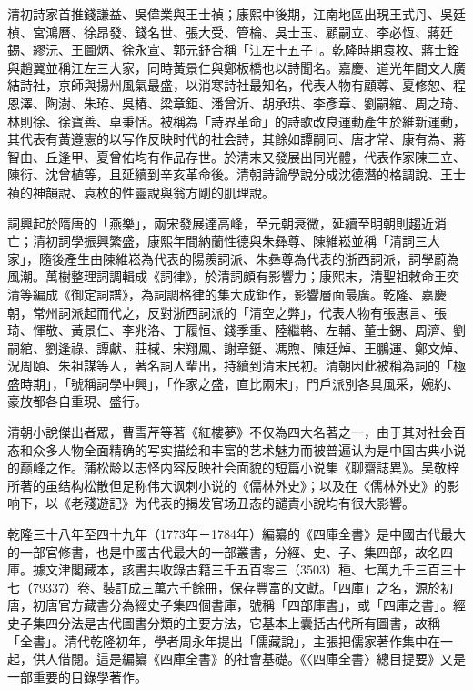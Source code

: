 清初詩家首推錢謙益、吳偉業與王士禎；康熙中後期，江南地區出現王式丹、吳廷楨、宮鴻曆、徐昂發、錢名世、張大受、管棆、吳士玉、顧嗣立、李必恆、蔣廷錫、繆沅、王圖炳、徐永宣、郭元𨥤合稱「江左十五子」。乾隆時期袁枚、蔣士銓與趙翼並稱江左三大家，同時黃景仁與鄭板橋也以詩聞名。嘉慶、道光年間文人廣結詩社，京師與揚州風氣最盛，以消寒詩社最知名，代表人物有顧蓴、夏修恕、程恩澤、陶澍、朱珔、吳椿、梁章鉅、潘曾沂、胡承珙、李彥章、劉嗣綰、周之琦、林則徐、徐寶善、卓秉恬。被稱為「詩界革命」的詩歌改良運動產生於維新運動，其代表有黃遵憲的以写作反映时代的社会詩，其餘如譚嗣同、唐才常、康有為、蔣智由、丘逢甲、夏曾佑均有作品存世。於清末又發展出同光體，代表作家陳三立、陳衍、沈曾植等，且延續到辛亥革命後。清朝詩論學說分成沈德潛的格調說、王士禎的神韻說、袁枚的性靈說與翁方剛的肌理說。

詞興起於隋唐的「燕樂」，兩宋發展達高峰，至元朝衰微，延續至明朝則趨近消亡；清初詞學振興繁盛，康熙年間納蘭性德與朱彝尊、陳維崧並稱「清詞三大家」，隨後產生由陳維崧為代表的陽羨詞派、朱彝尊為代表的浙西詞派，詞學蔚為風潮。萬樹整理詞調輯成《詞律》，於清詞頗有影響力；康熙末，清聖祖敕命王奕清等編成《御定詞譜》，為詞調格律的集大成鉅作，影響層面最廣。乾隆、嘉慶朝，常州詞派起而代之，反對浙西詞派的「清空之弊」，代表人物有張惠言、張琦、惲敬、黃景仁、李兆洛、丁履恒、錢季重、陸繼輅、左輔、董士錫、周濟、劉嗣綰、劉逢祿、譚獻、莊棫、宋翔鳳、謝章鋌、馮煦、陳廷焯、王鵬運、鄭文焯、況周頤、朱祖謀等人，著名詞人輩出，持續到清末民初。清朝因此被稱為詞的「極盛時期」，「號稱詞學中興」，「作家之盛，直比兩宋」，門戶派別各具風采，婉約、豪放都各自重現、盛行。

清朝小說傑出者眾，曹雪芹等著《紅樓夢》不仅為四大名著之一，由于其对社会百态和众多人物全面精确的写实描绘和丰富的艺术魅力而被普遍认为是中国古典小说的巅峰之作。蒲松龄以志怪内容反映社会面貌的短篇小说集《聊齋誌異》。吴敬梓所著的虽结构松散但足称伟大讽刺小说的《儒林外史》；以及在《儒林外史》的影响下，以《老殘遊記》为代表的揭发官场丑态的譴責小說均有很大影響。

乾隆三十八年至四十九年（1773年－1784年）編纂的《四庫全書》是中國古代最大的一部官修書，也是中國古代最大的一部叢書，分經、史、子、集四部，故名四庫。據文津閣藏本，該書共收錄古籍三千五百零三（3503）種、七萬九千三百三十七（79337）卷、裝訂成三萬六千餘冊，保存豐富的文獻。「四庫」之名，源於初唐，初唐官方藏書分為經史子集四個書庫，號稱「四部庫書」，或「四庫之書」。經史子集四分法是古代圖書分類的主要方法，它基本上囊括古代所有圖書，故稱 「全書」。清代乾隆初年，學者周永年提出「儒藏說」，主張把儒家著作集中在一起，供人借閱。這是編纂《四庫全書》的社會基礎。《〈四庫全書〉總目提要》又是一部重要的目錄學著作。

